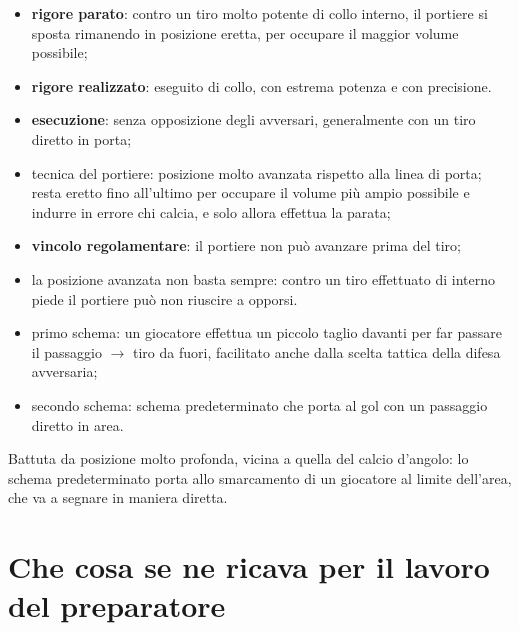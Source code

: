 \begin{itemize}
  \item \textbf{rigore parato}: contro un tiro molto potente di collo interno, il portiere si sposta
    rimanendo in posizione eretta, per occupare il maggior volume possibile;
  \item \textbf{rigore realizzato}: eseguito di collo, con estrema potenza e con precisione.
\end{itemize}

\begin{itemize}
  \item \textbf{esecuzione}: senza opposizione degli avversari, generalmente con un tiro diretto in
    porta;
  \item tecnica del portiere: posizione molto avanzata rispetto alla linea di porta; resta eretto
    fino all'ultimo per occupare il volume più ampio possibile e indurre in errore chi calcia, e
    solo allora effettua la parata;
  \item \textbf{vincolo regolamentare}: il portiere non può avanzare prima del tiro;
  \item la posizione avanzata non basta sempre: contro un tiro effettuato di interno piede il
    portiere può non riuscire a opporsi.
\end{itemize}

\begin{itemize}
  \item primo schema: un giocatore effettua un piccolo taglio davanti per far passare il passaggio
    $\rightarrow$ tiro da fuori, facilitato anche dalla scelta tattica della difesa avversaria;
  \item secondo schema: schema predeterminato che porta al gol con un passaggio diretto in area.
\end{itemize}

Battuta da posizione molto profonda, vicina a quella del calcio d'angolo: lo schema predeterminato
porta allo smarcamento di un giocatore al limite dell'area, che va a segnare in maniera diretta.

\section{Che cosa se ne ricava per il lavoro del preparatore}

